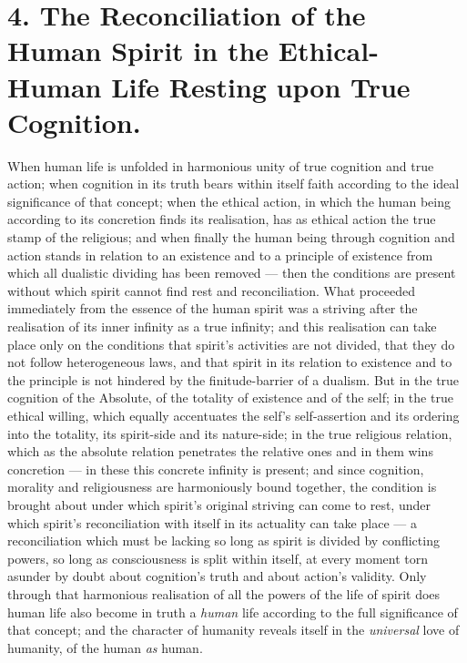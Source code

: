 \documentclass[12pt,a4paper]{book}
\begin{document}
\section*{4. The Reconciliation of the Human Spirit in the Ethical-Human Life Resting upon True Cognition.}

When human life is unfolded in harmonious unity of true cognition and true
action; when cognition in its truth bears within itself faith according to the
ideal significance of that concept; when the ethical action, in which the
human being according to its concretion finds its realisation, has as ethical
action the true stamp of the religious; and when finally the human being
through cognition and action stands in relation to an existence and to a
principle of existence from which all dualistic dividing has been removed ---
then the conditions are present without which spirit cannot find rest and
reconciliation. What proceeded immediately from the essence of the human
spirit was a striving after the realisation of its inner infinity as a
true infinity; and this realisation can take place only on the conditions that
spirit's activities are not divided, that they do not follow heterogeneous
laws, and that spirit in its relation to existence and to the principle is not
hindered by the finitude-barrier of a dualism. But in the true cognition of
the Absolute, of the totality of existence and of the self; in the true
ethical willing, which equally accentuates the self's self-assertion and its
ordering into the totality, its spirit-side and its nature-side; in the true
religious relation, which as the absolute relation penetrates the relative
ones and in them wins concretion --- in these this concrete infinity is
present; and since cognition, morality and religiousness are harmoniously
bound together, the condition is brought about under which spirit's original
striving can come to rest, under which spirit's reconciliation with itself in
its actuality can take place --- a reconciliation which must be lacking so
long as spirit is divided by conflicting powers, so long as consciousness is
split within itself, at every moment torn asunder by doubt about cognition's
truth and about action's validity. Only through that harmonious realisation of
all the powers of the life of spirit does human life also become in truth a
\emph{human} life according to the full significance of that concept; and the
character of humanity reveals itself in the \emph{universal} love of humanity,
of the human \emph{as} human.
\end{document}
